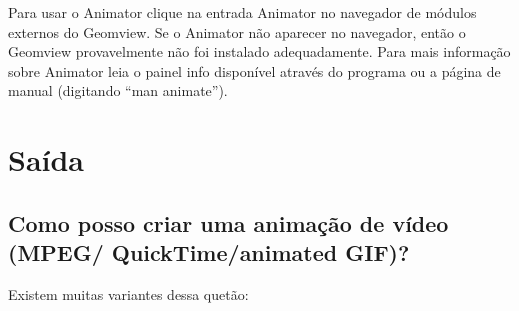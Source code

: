 \documentclass[12pt,a4paper]{article}
\begin{document}
        Para usar o Animator clique na entrada Animator no navegador de m\'{o}dulos externos
        do Geomview. Se o Animator n\~ao aparecer no navegador, ent\~ao o Geomview
        provavelmente n\~ao foi instalado adequadamente. Para mais informa\c{c}\~ao sobre
        Animator leia o painel info dispon\'ivel atrav\'es do programa ou a
        p\'agina de manual (digitando ``man animate'').

\section{Sa\'ida}

    \subsection{Como posso criar uma anima\c{c}\~ao de v\'ideo (MPEG/ QuickTime/animated GIF)?}

Existem muitas variantes dessa quet\~ao:
\end{document}
